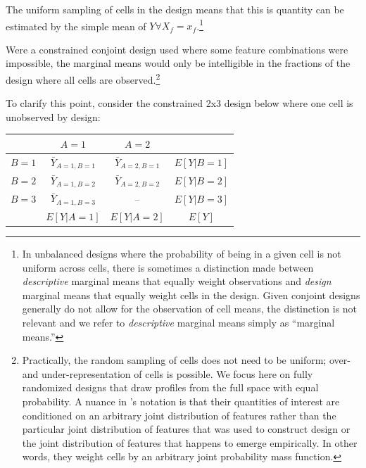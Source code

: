 \documentclass[a4paper,12pt]{article}\usepackage[]{graphicx}\usepackage[]{color}
\begin{document}
The uniform sampling of cells in the design means that this is quantity can be estimated by the simple mean of $Y \forall X_f = x_f$.\footnote{In unbalanced designs where the probability of being in a given cell is not uniform across cells, there is sometimes a distinction made between \textit{descriptive} marginal means that equally weight observations and \textit{design} marginal means that equally weight cells in the design. Given conjoint designs generally do not allow for the observation of cell means, the distinction is not relevant and we refer to \textit{descriptive} marginal means simply as ``marginal means.''}

Were a constrained conjoint design used where some feature combinations were impossible, the marginal means would only be intelligible in the fractions of the design where all cells are observed.\footnote{Practically, the random sampling of cells does not need to be uniform; over- and under-representation of cells is possible. We focus here on fully randomized designs that draw profiles from the full space with equal probability. A nuance in \citeauthor{HainmuellerHopkinsYamamoto2014}'s notation is that their quantities of interest are conditioned on an arbitrary joint distribution of features rather than the particular joint distribution of features that was used to construct design or the joint distribution of features that happens to emerge empirically. In other words, they weight cells by an arbitrary joint probability mass function.}

To clarify this point, consider the constrained 2x3 design below where one cell is unobserved by design:

\begin{center}
\begin{tabular}{lccc}\toprule
 & $A = 1$ & $A = 2$ & \\ \midrule
$B = 1$ & $\bar{Y}_{A=1, B=1}$ & $\bar{Y}_{A=2, B=1}$ & $E[Y|B=1]$ \\
$B = 2$ & $\bar{Y}_{A=1, B=2}$ & $\bar{Y}_{A=2, B=2}$ & $E[Y|B=2]$ \\
$B = 3$ & $\bar{Y}_{A=1, B=3}$ & -- & $E[Y|B=3]$ \\ \midrule
 & $E[Y|A=1]$ & $E[Y|A=2]$ & $E[Y]$ \\ \bottomrule
\end{tabular}
\end{center}
\end{document}
